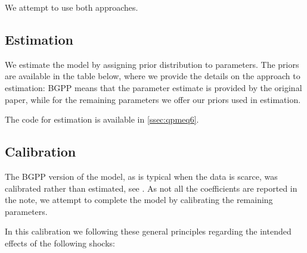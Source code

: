 \documentclass[12pt]{article}
\begin{document}
We attempt to use both approaches. 

\subsection{Estimation}

We estimate the model by assigning prior distribution to parameters. The priors are available in the table below, where we provide the details on the approach to estimation: BGPP means that the parameter estimate is provided by the original paper, while for the remaining parameters we offer our priors used in estimation. 

The code for estimation is available in \autoref{ssec:qpmeq6}.

\subsection{Calibration}

The BGPP version of the model, as is typical when the data is scarce, was calibrated rather than estimated, see \cite{borodin2014}. As not all the coefficients are reported in the note, we attempt to complete the model by calibrating the remaining parameters. 

In this calibration we following these general principles regarding the intended effects of the following shocks: 
\end{document}
